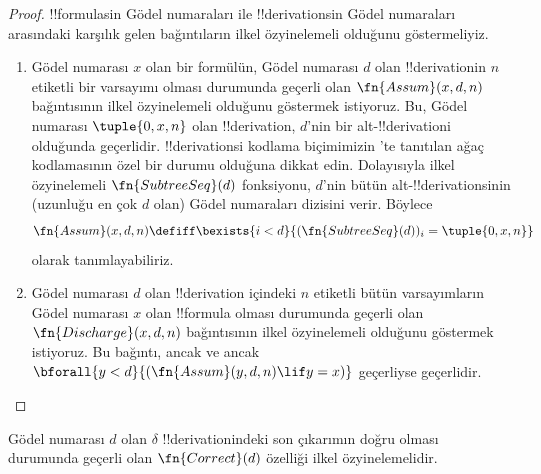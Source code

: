 \documentclass[../../../include/open-logic-section]{subfiles}
\begin{document}
\begin{proof}
  !!{formula}s{}in Gödel numaraları ile !!{derivation}s{}in Gödel numaraları
  arasındaki karşılık gelen bağıntıların ilkel özyinelemeli olduğunu
  göstermeliyiz.
  \begin{enumerate}
  \item Gödel numarası $x$ olan bir formülün, Gödel numarası $d$ olan
    !!{derivation}{}in $n$ etiketli bir varsayımı olması durumunda geçerli olan
    $\fn{Assum}(x, d, n)$ bağıntısının ilkel özyinelemeli olduğunu göstermek
    istiyoruz. Bu, Gödel numarası $\tuple{0, x, n}$ olan !!{derivation},
    $d$'nin bir alt-!!{derivation}{}i olduğunda geçerlidir. !!{derivation}s{}i
    kodlama biçimimizin 'te tanıtılan ağaç
    kodlamasının özel bir durumu olduğuna dikkat edin. Dolayısıyla ilkel
    özyinelemeli $\fn{SubtreeSeq}(d)$ fonksiyonu, $d$'nin bütün
    alt-!!{derivation}s{}inin (uzunluğu en çok $d$ olan) Gödel numaraları
    dizisini verir. Böylece
    \[
    \fn{Assum}(x, d, n) \defiff \bexists{i<d}{(\fn{SubtreeSeq}(d))_i =
      \tuple{0, x, n}}
    \]
    olarak tanımlayabiliriz.
  \item Gödel numarası $d$ olan !!{derivation} içindeki $n$ etiketli bütün
    varsayımların Gödel numarası $x$ olan !!{formula} olması durumunda geçerli
    olan $\fn{Discharge}(x, d, n)$ bağıntısının ilkel özyinelemeli olduğunu
    göstermek istiyoruz. Bu bağıntı, ancak ve ancak
    $\bforall{y<d}{(\fn{Assum}(y, d, n) \lif y = x)}$ geçerliyse geçerlidir.
  \end{enumerate}
\end{proof}

\begin{prop}
  Gödel numarası $d$ olan $\delta$ !!{derivation}{}indeki son çıkarımın doğru
  olması durumunda geçerli olan $\fn{Correct}(d)$ özelliği ilkel
  özyinelemelidir.
\end{prop}
\end{document}
